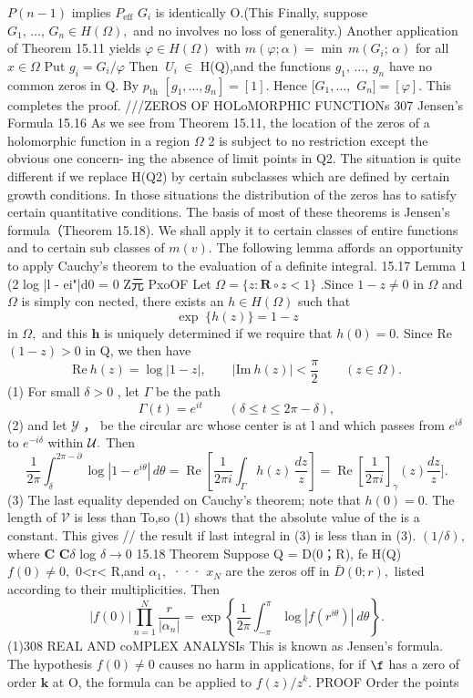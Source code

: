 $P(n-1)$ implies $\scriptstyle{P_{\mathrm{eff}}}$ $G_{i}$ is identically O.(This Finally, suppose $G_{1},\,\ldots,\,G_{n}\in H(\Omega),$ and no involves no loss of generality.) Another application of Theorem 15.11 yields $\varphi\in H(\Omega)$ with $m(\varphi;\alpha)=\operatorname*{min}\,m(G_{i};\,\alpha)$ for all $\scriptstyle x\in\Omega$ Put $g_{i}=G_{i}/\varphi$ Then $\ U_{i}\ \in$ H(Q),and the functions $g_{1},\,\ldots,\,g_{n}$ have no common zeros in Q. By $\scriptstyle{p_{\mathrm{th}}}$ $[g_{1},\dots,g_{n}]=[1].$ Hence $[G_{1},\ldots,$ $G_{n}]=[\varphi].$ This completes the proof. ///ZEROS OF HOLoMORPHIC FUNCTIONs 307 Jensen's Formula 15.16 As we see from Theorem 15.11, the location of the zeros of a holomorphic function in a region $\Omega$ 2 is subject to no restriction except the obvious one concern- ing the absence of limit points in Q2. The situation is quite different if we replace H(Q2) by certain subclasses which are defined by certain growth conditions. In those situations the distribution of the zeros has to satisfy certain quantitative conditions. The basis of most of these theorems is Jensen's formula（Theorem 15.18). We shall apply it to certain classes of entire functions and to certain sub classes of $m(v).$ The following lemma affords an opportunity to apply Cauchy's theorem to the evaluation of a definite integral. 15.17 Lemma 1 (2 log |l - ei"|d0 = 0 Z元 PxoOF Let $\Omega=\{z\colon\mathbf{R}\circ z<1\}$ .Since $1-z\neq0$ in $\Omega$ and $\Omega$ is simply con nected, there exists an $h\in H(\Omega)$ such that $$ \exp\;\{h(z)\}=1-z $$ in $\Omega,$ and this ${\boldsymbol{h}}$ is uniquely determined if we require that $h(0)=0.$ Since Re $(1-z)>0$ in Q, we then have $$ \mathrm{Re}~h(z)=\log\vert1-z\vert,\qquad\vert\mathrm{Im}~h(z)\vert<{\frac{\pi}{2}}\qquad(z\in\Omega). $$ (1) For small $\delta>0$ , let ${\Gamma}$ be the path $$ \Gamma(t)=e^{i t}\qquad(\delta\leq t\leq2\pi-\delta), $$ (2) and let $\scriptstyle{\mathcal{Y}}$ ， be the circular arc whose center is at l and which passes from $e^{i\delta}$ to $e^{-i\delta}$ within ${\cal U}.$ Then $$ {\frac{1}{2\pi}}\int_{\delta}^{2\pi-\partial}\log\left|1-e^{i\theta}\right|\,d\theta=\operatorname{Re}\left[{\frac{1}{2\pi i}}\int_{\Gamma}h(z)\,{\frac{d z}{z}}\right]=\operatorname{Re}\left[{\frac{1}{2\pi i}}\right]_{\gamma}\left(z\right){\frac{d z}{z}} ]. $$ (3) The last equality depended on Cauchy's theorem; note that $h(0)=0.$ The length of $\scriptstyle{\mathcal{V}}$ is less than To,so (1) shows that the absolute value of the is a constant. This gives // the result if last integral in (3) is less than in (3). $(1/\delta),$ where ${\boldsymbol{C}}$ ${\boldsymbol{C}}\delta$ log $\delta\to0$ 15.18 Theorem Suppose Q = D(0；R), fe H(Q) $f(0)\neq0,$ 0<r< R,and $\alpha_{1},$ ··· $x_{N}$ are the zeros off in ${\bar{D}}(0;r),$ listed according to their multiplicities. Then $$ |f(0)|\prod_{n=1}^{N}\frac{r}{|\alpha_{n}|}=\exp\left\{\frac{1}{2\pi}\int_{-\pi}^{\pi}\log|f(r^{i\theta})|\ d\theta\right\}. $$ (1)308 REAL AND coMPLEX ANALYSIs This is known as Jensen's formula. The hypothesis $f(0)\neq0$ causes no harm in applications, for if $\boldsymbol{\f}$ has a zero of order $\boldsymbol{k}$ at O, the formula can be applied to $f(z)/z^{k}.$ PROOF Order the points 